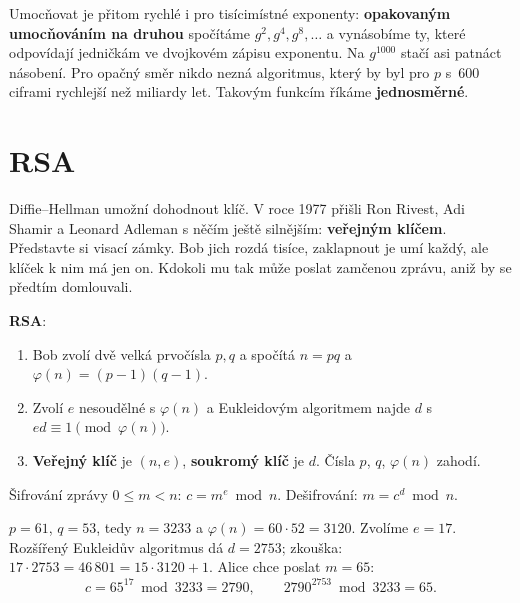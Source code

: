 Umocňovat je přitom rychlé i pro tisícimístné exponenty: \textbf{opakovaným umocňováním na druhou} spočítáme $g^2, g^4, g^8, \ldots$ a vynásobíme ty, které odpovídají jedničkám ve dvojkovém zápisu exponentu. Na $g^{1000}$ stačí asi patnáct násobení. Pro opačný směr nikdo nezná algoritmus, který by byl pro $p$ s~$600$ ciframi rychlejší než miliardy let. Takovým funkcím říkáme \textbf{jednosměrné}.

\section{RSA}

Diffie--Hellman umožní dohodnout klíč. V roce 1977 přišli Ron Rivest, Adi Shamir a Leonard Adleman s něčím ještě silnějším: \textbf{veřejným klíčem}. Představte si visací zámky. Bob jich rozdá tisíce, zaklapnout je umí každý, ale klíček k nim má jen on. Kdokoli mu tak může poslat zamčenou zprávu, aniž by se předtím domlouvali.

\begin{definitionbox}
  \textbf{RSA}:
  \begin{enumerate}
    \item Bob zvolí dvě velká prvočísla $p, q$ a spočítá $n = pq$ a $\varphi(n) = (p - 1)(q - 1)$.
    \item Zvolí $e$ nesoudělné s $\varphi(n)$ a Eukleidovým algoritmem najde $d$ s $ed\equiv 1\pmod{\varphi(n)}$.
    \item \textbf{Veřejný klíč} je $(n, e)$, \textbf{soukromý klíč} je $d$. Čísla $p$, $q$, $\varphi(n)$ zahodí.
  \end{enumerate}
  Šifrování zprávy $0\leq m < n$: $c = m^e\bmod n$. Dešifrování: $m = c^d\bmod n$.
\end{definitionbox}

\begin{example}
  $p = 61$, $q = 53$, tedy $n = 3233$ a $\varphi(n) = 60\cdot 52 = 3120$. Zvolíme $e = 17$. Rozšířený Eukleidův algoritmus dá $d = 2753$; zkouška: $17\cdot 2753 = 46\,801 = 15\cdot 3120 + 1$. Alice chce poslat $m = 65$:
  \begin{equation*}
    c = 65^{17}\bmod 3233 = 2790,\qquad 2790^{2753}\bmod 3233 = 65.
  \end{equation*}
\end{example}

\begin{center}
\end{center}


